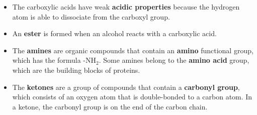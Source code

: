 \begin{itemize}
\item{The carboxylic acids have weak \textbf{acidic properties} because the hydrogen atom is able to dissociate from the carboxyl group.}
\item{An \textbf{ester} is formed when an alcohol reacts with a carboxylic acid.}
\item{The \textbf{amines} are organic compounds that contain an \textbf{amino} functional group, which has the formula -NH$_{2}$. Some amines belong to the \textbf{amino acid} group, which are the building blocks of proteins.}
\item{The \textbf{ketones} are a group of compounds that contain a \textbf{carbonyl group}, which consists of an oxygen atom that is double-bonded to a carbon atom. In a ketone, the carbonyl group is on the end of the carbon chain.}

\end{itemize}


